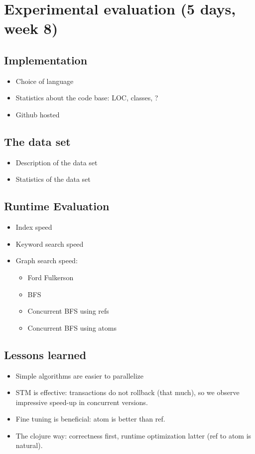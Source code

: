 \documentclass[12pt,letterpaper,oneside,notitlepage]{report}
\theoremstyle{definition}
\begin{document}
  \chapter{Experimental evaluation (5 days, week 8)}
    \section{Implementation}
      \begin{itemize}
        \item Choice of language
        \item Statistics about the code base: LOC, classes, ?
        \item Github hosted
      \end{itemize}

    \section{The data set}
      \begin{itemize}
        \item Description of the data set
        \item Statistics of the data set
      \end{itemize}

    \section{Runtime Evaluation}
      \begin{itemize}
        \item Index speed
        \item Keyword search speed
        \item Graph search speed:
          \begin{itemize}
            \item Ford Fulkerson
            \item BFS
            \item Concurrent BFS using refs
            \item Concurrent BFS using atoms
          \end{itemize}
      \end{itemize}

    \section{Lessons learned}
      \begin{itemize}
        \item Simple algorithms are easier to parallelize
        \item STM is effective: transactions do not rollback (that much), so we observe impressive speed-up in concurrent versions.
        \item Fine tuning is beneficial: atom is better than ref.
        \item The clojure way: correctness first, runtime optimization latter (ref to atom is natural).
      \end{itemize}
\end{document}
